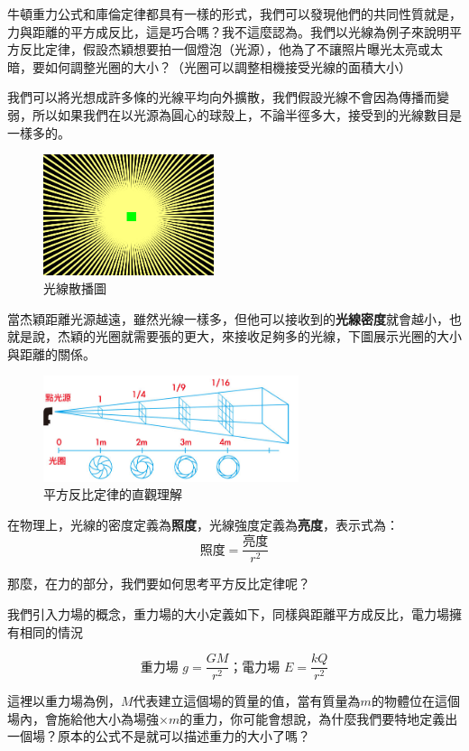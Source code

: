 \begin{tcolorbox}[breakable, title={專欄：平方反比定律}, before upper={\parindent2em}, parbox=false]

牛頓重力公式和庫倫定律都具有一樣的形式，我們可以發現他們的共同性質就是，力與距離的平方成反比，這是巧合嗎？我不這麼認為。我們以光線為例子來說明平方反比定律，假設杰穎想要拍一個燈泡（光源），他為了不讓照片曝光太亮或太暗，要如何調整光圈的大小？（光圈可以調整相機接受光線的面積大小）

我們可以將光想成許多條的光線平均向外擴散，我們假設光線不會因為傳播而變弱，所以如果我們在以光源為圓心的球殼上，不論半徑多大，接受到的光線數目是一樣多的。
\begin{figure}[H]
\centering
\graphicspath{{physics/}}
\includegraphics[width=5cm, center]{light.png}
\caption{光線散播圖}
\label{fig:light}
\end{figure}
當杰穎距離光源越遠，雖然光線一樣多，但他可以接收到的\textbf{光線密度}就會越小，也就是說，杰穎的光圈就需要張的更大，來接收足夠多的光線，下圖展示光圈的大小與距離的關係。
\begin{figure}[H]
\centering
\graphicspath{{physics/}}
\includegraphics[width=7.5cm, center]{square-light.png}
\caption{平方反比定律的直觀理解}
\label{fig:light}
\end{figure}
在物理上，光線的密度定義為\textbf{照度}，光線強度定義為\textbf{亮度}，表示式為：
$$ \mbox{照度} = \frac{\mbox{亮度}}{r^2} $$

那麼，在力的部分，我們要如何思考平方反比定律呢？

我們引入力場的概念，重力場的大小定義如下，同樣與距離平方成反比，電力場擁有相同的情況

$$ \mbox{重力場 } g = \frac{GM}{r^2} \mbox{；電力場 }E=\frac{kQ}{r^2} $$

這裡以重力場為例，$M$代表建立這個場的質量的值，當有質量為$m$的物體位在這個場內，會施給他大小為場強$\times m$的重力，你可能會想說，為什麼我們要特地定義出一個場？原本的公式不是就可以描述重力的大小了嗎？


\end{tcolorbox}
